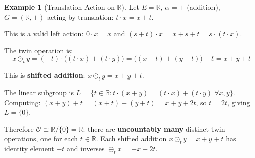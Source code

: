 \documentclass[11pt,a4paper,openany]{book}
\theoremstyle{plain}
\theoremstyle{definition}
\newtheorem{example}[theorem]{Example}
\newcommand{\twing}[1]{\odot_{#1}}
\newcommand{\opspace}{\mathcal{O}}
\newcommand{\lingroup}{L}
\newcommand{\actspace}{E}
\newcommand{\groupG}{G}
\newcommand{\RR}{\mathbb{R}}
\begin{document}
\begin{example}[Translation Action on $\RR$]\label{ex:translation}
Let $\actspace = \RR$, $\alpha = +$ (addition), $\groupG = (\RR, +)$ acting by translation: $t \cdot x = x + t$.

This is a valid left action: $0 \cdot x = x$ and $(s + t) \cdot x = x + s + t = s \cdot (t \cdot x)$.

The twin operation is:
\[
x \twing{t} y = (-t) \cdot \big((t \cdot x) + (t \cdot y)\big) = \big((x + t) + (y + t)\big) - t = x + y + t
\]

This is \textbf{shifted addition}: $x \twing{t} y = x + y + t$.

The linear subgroup is $\lingroup = \{t \in \RR : t \cdot (x + y) = (t \cdot x) + (t \cdot y)\ \forall x,y\}$. Computing: $(x + y) + t = (x + t) + (y + t) = x + y + 2t$, so $t = 2t$, giving $\lingroup = \{0\}$.

Therefore $\opspace \cong \RR / \{0\} = \RR$: there are \textbf{uncountably many} distinct twin operations, one for each $t \in \RR$. Each shifted addition $x \twing{t} y = x + y + t$ has identity element $-t$ and inverses $\ominus_t x = -x - 2t$.
\end{example}
\end{document}
